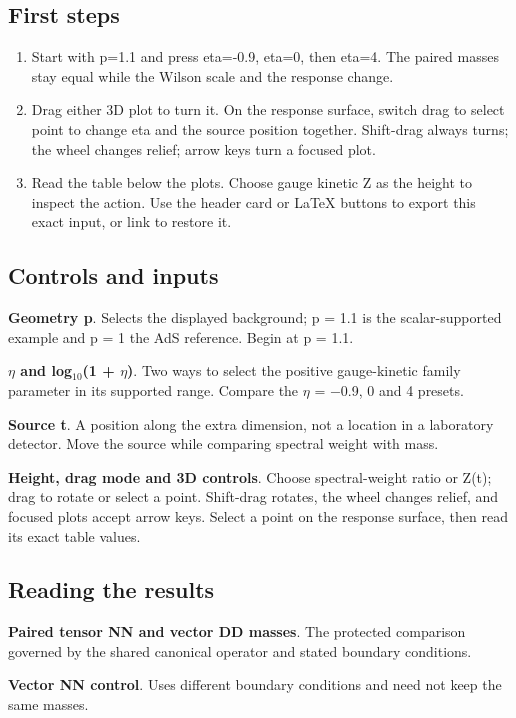 \documentclass[11pt,a4paper]{article}
\begin{document}
\subsection*{First steps}
\begin{enumerate}
\item Start with p=1.1 and press eta=-0.9, eta=0, then eta=4. The paired masses stay equal while the Wilson scale and the response change.
\item Drag either 3D plot to turn it. On the response surface, switch drag to select point to change eta and the source position together. Shift-drag always turns; the wheel changes relief; arrow keys turn a focused plot.
\item Read the table below the plots. Choose gauge kinetic Z as the height to inspect the action. Use the header card or LaTeX buttons to export this exact input, or link to restore it.
\end{enumerate}
\subsection*{Controls and inputs}
\textbf{Geometry p}. Selects the displayed background; p = 1.1 is the scalar-supported example and p = 1 the AdS reference. Begin at p = 1.1.

\textbf{\ensuremath{\eta} and log\ensuremath{{}_{10}}(1 + \ensuremath{\eta})}. Two ways to select the positive gauge-kinetic family parameter in its supported range. Compare the \ensuremath{\eta} = \ensuremath{-}0.9, 0 and 4 presets.

\textbf{Source t}. A position along the extra dimension, not a location in a laboratory detector. Move the source while comparing spectral weight with mass.

\textbf{Height, drag mode and 3D controls}. Choose spectral-weight ratio or Z(t); drag to rotate or select a point. Shift-drag rotates, the wheel changes relief, and focused plots accept arrow keys. Select a point on the response surface, then read its exact table values.

\subsection*{Reading the results}
\textbf{Paired tensor NN and vector DD masses}. The protected comparison governed by the shared canonical operator and stated boundary conditions.

\textbf{Vector NN control}. Uses different boundary conditions and need not keep the same masses.
\end{document}
